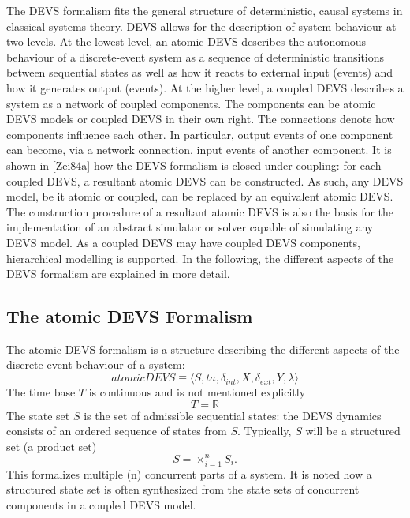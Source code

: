 The DEVS formalism fits the general structure of deterministic, causal systems in classical systems theory. DEVS allows 
for the description of system behaviour at two levels. At the lowest level, an atomic DEVS describes the autonomous 
behaviour of a discrete-event system as a sequence of deterministic transitions between sequential states as well as 
how it reacts to external input (events) and how it generates output (events). At the higher level, a coupled DEVS 
describes a system as a network of coupled components. The components can be atomic DEVS models or coupled DEVS in their 
own right. The connections denote how components influence each other. In particular, output events of one component 
can become, via a network connection, input events of another component. It is shown in [Zei84a] how the DEVS formalism 
is closed under coupling: for each coupled DEVS, a resultant atomic DEVS can be constructed. As such, any DEVS model, 
be it atomic or coupled, can be replaced by an equivalent atomic DEVS. The construction procedure of a resultant atomic 
DEVS is also the basis for the implementation of an abstract simulator or solver capable of simulating any DEVS model. 
As a coupled DEVS may have coupled DEVS components, hierarchical modelling is supported. In the following, the different 
aspects of the DEVS formalism are explained in more detail.

\subsection{The atomic DEVS Formalism}
The atomic DEVS formalism is a structure describing the different aspects of the discrete-event behaviour of a system:
\begin{equation}
    atomicDEVS \equiv \langle S, ta, \delta_{int}, X, \delta_{ext}, Y, \lambda \rangle
\end{equation}
The time base $T$ is continuous and is not mentioned explicitly
\begin{equation}
    T = \mathbb{R}
\end{equation}
The state set $S$ is the set of admissible sequential states: the DEVS dynamics consists of an ordered sequence of states
from $S$. Typically, $S$ will be a structured set (a product set)
\begin{equation}
    S = \times_{i=1}^{n} S_i.
\end{equation}
This formalizes multiple (n) concurrent parts of a system. It is noted how a structured state set is often synthesized
from the state sets of concurrent components in a coupled DEVS model. 

